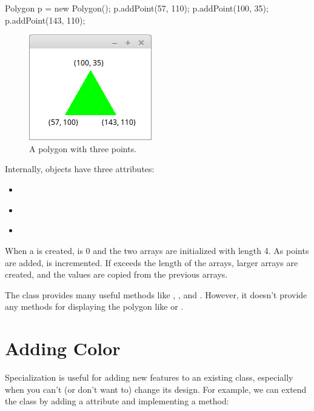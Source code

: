 \begin{code}
Polygon p = new Polygon();
p.addPoint(57, 110);
p.addPoint(100, 35);
p.addPoint(143, 110);
\end{code}

\begin{figure}[!ht]
\begin{center}
\includegraphics{figs/triangle.png}
\caption{A polygon with three points.}
\label{fig:triangle}
\end{center}
\end{figure}

Internally,  objects have three attributes:

\begin{itemize}
\item {} {\tt ~~~} 
\item {} {\tt ~} 
\item {} {\tt ~} 
\end{itemize}

When a  is created,  is 0 and the two arrays are initialized with length 4.
As points are added,  is incremented.
If  exceeds the length of the arrays, larger arrays are created, and the values are copied from the previous arrays.

The  class provides many useful methods like , , and .
However, it doesn't provide any methods for displaying the polygon like  or .


\section{Adding Color}

Specialization is useful for adding new features to an existing class, especially when you can't (or don't want to) change its design.
For example, we can extend the  class by adding a  attribute and implementing a  method:


